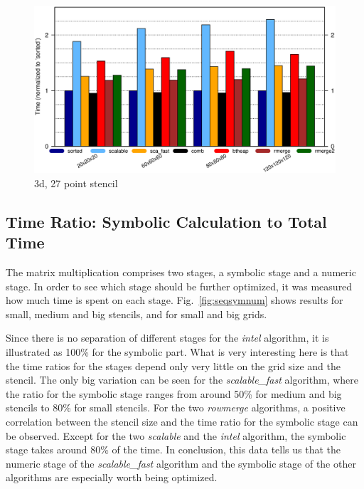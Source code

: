 \begin{figure}[tbp]
	\centering
	\includegraphics[width=1.05\textwidth, trim={0 7.3cm 0 1cm},clip]{seq_3d27point}
	\caption{3d, 27 point stencil} 
	\label{fig:seq3d27point}
\end{figure}

\subsection{Time Ratio: Symbolic Calculation to Total Time}
The matrix multiplication comprises two stages, a symbolic stage and a numeric stage. In order to see which stage should be further optimized, it was measured how much time is spent on each stage. Fig.~\ref{fig:seqsymnum} shows results for small, medium and big stencils, and for small and big grids. 

Since there is no separation of different stages for the \textit{intel} algorithm, it is illustrated as 100\% for the symbolic part. What is very interesting here is that the time ratios for the stages depend only very little on the grid size and the stencil. The only big variation can be seen for the \textit{scalable\_fast} algorithm, where the ratio for the symbolic stage ranges from around 50\% for medium and big stencils to 80\% for small stencils. For the two \textit{rowmerge} algorithms, a positive correlation between the stencil size and the time ratio for the symbolic stage can be observed. Except for the two \textit{scalable} and the \textit{intel} algorithm, the symbolic stage takes around 80\% of the time. In conclusion, this data tells us that the numeric stage of the \textit{scalable\_fast} algorithm and the symbolic stage of the other algorithms are especially worth being optimized.

